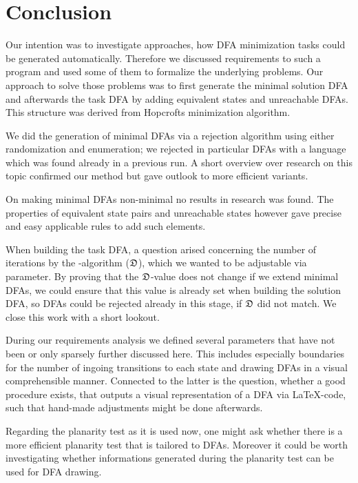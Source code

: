 
\chapter{Conclusion}

Our intention was to investigate approaches, how DFA minimization tasks could be generated automatically. Therefore we discussed requirements to such a program and used some of them to formalize the underlying problems. Our approach to solve those problems was to first generate the minimal solution DFA and afterwards the task DFA by adding equivalent states and unreachable DFAs. This structure was derived from Hopcrofts minimization algorithm.

We did the generation of minimal DFAs via a rejection algorithm using either randomization and enumeration; we rejected in particular DFAs with a language which was found already in a previous run. A short overview over research on this topic confirmed our method but gave outlook to more efficient variants.

On making minimal DFAs non-minimal no results in research was found. The properties of equivalent state pairs and unreachable states however gave precise and easy applicable rules to add such elements.

When building the task DFA, a question arised concerning the number of iterations by the \CompDist-algorithm ($\mathfrak{D}$), which we wanted to be adjustable via parameter. By proving that the $\mathfrak{D}$-value does not change if we extend minimal DFAs, we could ensure that this value is already set when building the solution DFA, so DFAs could be rejected already in this stage, if $\mathfrak{D}$ did not match. We close this work with a short lookout.

During our requirements analysis we defined several parameters that have not been or only sparsely further discussed here. This includes especially boundaries for the number of ingoing transitions to each state and drawing DFAs in a visual comprehensible manner. Connected to the latter is the question, whether a good procedure exists, that outputs a visual representation of a DFA via \LaTeX-code, such that hand-made adjustments might be done afterwards.

Regarding the planarity test as it is used now, one might ask whether there is a more efficient planarity test that is tailored to DFAs. Moreover it could be worth investigating whether informations generated during the planarity test can be used for DFA drawing.

